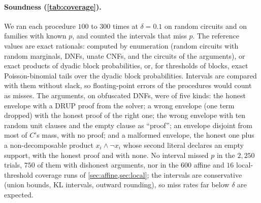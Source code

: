 \paragraph{Soundness (\cref{tab:coverage}).} We ran each procedure $100$ to $300$ times
at $\delta=0.1$ on random circuits and on families with known $p$, and counted the
intervals that miss $p$. The reference values are exact rationals: computed by
enumeration (random circuits with random marginals, DNFs, unate CNFs, and the circuits
of the arguments), or exact products of dyadic block probabilities, or, for thresholds
of blocks, exact Poisson-binomial tails over the dyadic block probabilities.
Intervals are compared with them without slack, so floating-point errors of the
procedures would count as misses. The arguments, on obfuscated DNFs, were of five
kinds: the honest envelope with a DRUP proof from the solver; a wrong envelope (one
term dropped) with the honest proof of the right one; the wrong envelope with ten random
unit clauses and the empty clause as ``proof''; an envelope disjoint from most of
$C$'s mass, with no proof; and a malformed envelope, the honest one plus a
non-decomposable product $x_i\wedge\neg x_i$ whose second literal declares an empty
support, with the honest proof and with none. No interval missed $p$ in the $2{,}250$
trials, $750$ of them with dishonest arguments, nor in the $600$ affine and $16$
local-threshold coverage runs of \cref{sec:affine,sec:local}; the intervals are
conservative (union bounds, KL intervals, outward rounding), so miss rates far below
$\delta$ are expected.

\begin{table}[ht]
\centering\small

\caption{Empirical miss rates at $\delta=0.1$, with intervals compared to the
reference values without slack (\texttt{exp\_coverage.py}).}
\label{tab:coverage}
\end{table}

